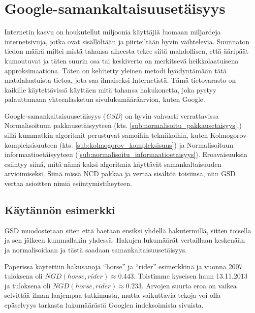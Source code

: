 \documentclass[12pt,finnish]{tktltiki2}
\theoremstyle{definition}
\theoremstyle{remark}
\begin{document}

\section{Google-samankaltaisuusetäisyys} %
  \label{sec:google_samankaltaisuusetaisyys}

    Internetin kasvu on houkutellut miljoonia käyttäjiä luomaan miljardeja internetsivuja, jotka ovat sisällöltään ja piirteiltään hyvin vaihtelevia.
    Suunnaton tiedon määrä miltei mistä tahansa aiheesta tekee siitä mahdollisen, että ääripäät kumoutuvat ja täten suurin osa tai keskiverto on merkitsevä heikkolaatuisena approksimaationa.
    Täten on kehitetty yleinen metodi hyödyntämään tätä matalalaatuista tietoa, jota saa ilmaiseksi Internetistä.
    Tämä tietovarasto on kaikille käytettävissä käyttäen mitä tahansa hakukonetta, joka pystyy palauttamaan yhteenlasketun sivulukumääräarvion, kuten Google.

    Google-samankaltaisuusetäisyys (\emph{GSD}) on hyvin vahvasti verrattavissa Normalisoituun pakkausetäisyyteen (kts. \ref{sub:normalisoitu_pakkausetaisyys},) sillä kummatkin algoritmit perustuvat samoihin tekniikoihin, kuten Kolmogorov-kompleksisuuteen (kts. \ref{sub:kolmogorov_kompleksisuus}) ja Normalisoituun informaatioetäisyyteen (\ref{sub:normalisoitu_informaatioetaisyys}).
    Eroavaisuuksia esiintyy siinä, mitä nämä kaksi algoritmia käyttävät samankaltaisuuden arvioimiseksi.
    Siinä missä NCD pakkaa ja vertaa sisältöä toisiinsa, niin GSD vertaa asioitten nimiä esiintymistiheyteen. \cite{cilibrasi2007google}

    \subsection{Käytännön esimerkki} %
    \label{sub:kaytannon_esimerkki}
      GSD muodostetaan siten että haetaan ensiksi yhdellä hakutermillä, sitten toisella ja sen jälkeen kummallakin yhdessä.
      Hakujen lukumäärät vertaillaan keskenään ja normalisoidaan ja tästä saadaan samankaltaisuusetäisyys.

      Paperissa \cite{cilibrasi2007google} käytettiin hakusanoja ``horse'' ja ``rider'' esimerkkinä ja vuonna 2007 tuloksena oli $NGD(horse, rider) \approx 0.443$.
      Toistimme kyseisen haun 13.11.2013 ja tuloksena oli $NGD(horse, rider) \approx 0.233$.
      Arvojen suurta eroa on vaikea selvittää ilman laajempaa tutkimusta, mutta vaikuttavia tekoja voi olla epäselvyys tarkasta lukumäärästä Googlen indeksoimista sivuista.
\end{document}
